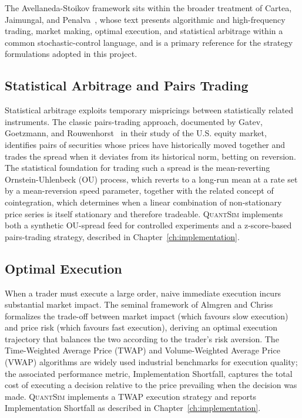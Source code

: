 \documentclass[12pt,oneside,a4paper]{report}
\newcommand{\quantsim}{\textsc{QuantSim}}
\begin{document}
The Avellaneda-Stoikov framework sits within the broader treatment of Cartea, Jaimungal, and Penalva~\cite{cartea2015}, whose text presents algorithmic and high-frequency trading, market making, optimal execution, and statistical arbitrage within a common stochastic-control language, and is a primary reference for the strategy formulations adopted in this project.

\subsection{Statistical Arbitrage and Pairs Trading}

Statistical arbitrage exploits temporary mispricings between statistically related instruments. The classic pairs-trading approach, documented by Gatev, Goetzmann, and Rouwenhorst~\cite{gatev2006} in their study of the U.S. equity market, identifies pairs of securities whose prices have historically moved together and trades the spread when it deviates from its historical norm, betting on reversion. The statistical foundation for trading such a spread is the mean-reverting Ornstein-Uhlenbeck (OU) process, which reverts to a long-run mean at a rate set by a mean-reversion speed parameter, together with the related concept of cointegration, which determines when a linear combination of non-stationary price series is itself stationary and therefore tradeable. \quantsim{} implements both a synthetic OU-spread feed for controlled experiments and a z-score-based pairs-trading strategy, described in Chapter~\ref{ch:implementation}.

\subsection{Optimal Execution}

When a trader must execute a large order, naive immediate execution incurs substantial market impact. The seminal framework of Almgren and Chriss~\cite{almgren2001} formalizes the trade-off between market impact (which favours slow execution) and price risk (which favours fast execution), deriving an optimal execution trajectory that balances the two according to the trader's risk aversion. The Time-Weighted Average Price (TWAP) and Volume-Weighted Average Price (VWAP) algorithms are widely used industrial benchmarks for execution quality; the associated performance metric, Implementation Shortfall, captures the total cost of executing a decision relative to the price prevailing when the decision was made. \quantsim{} implements a TWAP execution strategy and reports Implementation Shortfall as described in Chapter~\ref{ch:implementation}.
\end{document}
